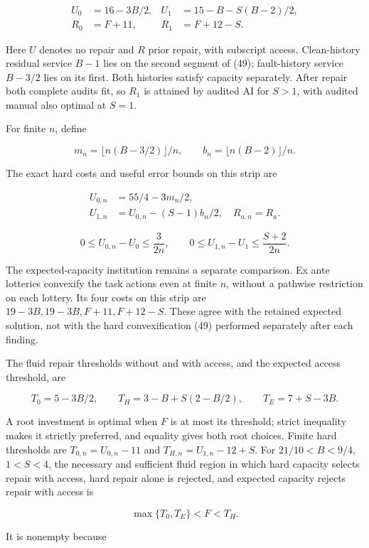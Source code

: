 \documentclass[
  11pt,
  a4paper,
]{article}
\begin{document}
\[\begin{aligned}
U_0&=16-3B/2, &U_1&=15-B-S(B-2)/2,\\
R_0&=F+11, &R_1&=F+12-S.
\end{aligned} \tag{50}\]

Here \(U\) denotes no repair and \(R\) prior repair, with subscript
access. Clean-history residual service \(B-1\) lies on the second
segment of (49); fault-history service \(B-3/2\) lies on its first. Both
histories satisfy capacity separately. After repair both complete audits
fit, so \(R_1\) is attained by audited AI for \(S>1\), with audited
manual also optimal at \(S=1\).

For finite \(n\), define

\[m_n=\lfloor n(B-3/2)\rfloor/n,\qquad
b_n=\lfloor n(B-2)\rfloor/n.\]

The exact hard costs and useful error bounds on this strip are

\[\begin{aligned}
U_{0,n}&=55/4-3m_n/2,\\
U_{1,n}&=U_{0,n}-(S-1)b_n/2,\quad R_{a,n}=R_a.
\end{aligned} \tag{51}\]

\[0\leq U_{0,n}-U_0\leq\frac{3}{2n},\qquad
0\leq U_{1,n}-U_1\leq\frac{S+2}{2n}. \tag{52}\]

The expected-capacity institution remains a separate comparison. Ex ante
lotteries convexify the task actions even at finite \(n\), without a
pathwise restriction on each lottery. Its four costs on this strip are
\(19-3B,19-3B,F+11,F+12-S\). These agree with the retained expected
solution, not with the hard convexification (49) performed separately
after each finding.

The fluid repair thresholds without and with access, and the expected
access threshold, are

\[T_0=5-3B/2,\qquad T_H=3-B+S(2-B/2),\qquad
T_E=7+S-3B. \tag{53}\]

A root investment is optimal when \(F\) is at most its threshold; strict
inequality makes it strictly preferred, and equality gives both root
choices. Finite hard thresholds are \(T_{0,n}=U_{0,n}-11\) and
\(T_{H,n}=U_{1,n}-12+S\). For \(21/10<B<9/4\), \(1<S<4\), the necessary
and sufficient fluid region in which hard capacity selects repair with
access, hard repair alone is rejected, and expected capacity rejects
repair with access is

\[\max\{T_0,T_E\}<F<T_H. \tag{54}\]

It is nonempty because
\end{document}
